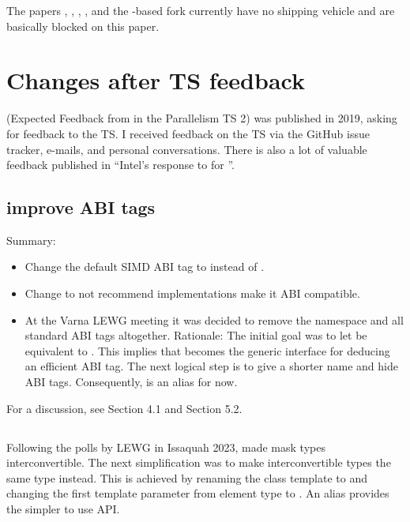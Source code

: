 The papers , , , , and
the -based  fork currently have no shipping vehicle
and are basically blocked on this paper.

\section{Changes after TS feedback}\label{sec:changes}
\cite{P1915R0} (Expected Feedback from  in the Parallelism TS 2) was published in 2019, asking for feedback to the TS.
I received feedback on the TS via the GitHub issue tracker, e-mails, and personal conversations.
There is also a lot of valuable feedback published in  ``Intel’s response to  for \std{}''.

\subsection{improve ABI tags}
Summary:
\begin{itemize}
  \item Change the default SIMD ABI tag to \simdabi{} instead of \simdabi{}.
  \item Change \simdabi{} to not recommend implementations make it ABI compatible.
  \item At the Varna LEWG meeting it was decided to remove the 
    namespace and all standard ABI tags altogether.
    Rationale: The initial goal was to let  be equivalent to
    \stdx\simdabi{}.
    This implies that \stdx{} becomes the generic
    interface for deducing an efficient ABI tag.
    The next logical step is to give  a shorter name and
    hide ABI tags.
    Consequently, \std{} is an alias for
    \std{} now.
\end{itemize}

For a discussion, see  Section 4.1 and  Section 5.2.

\subsection{}\label{sec:basicsimdmask}
Following the polls by LEWG in Issaquah 2023,  made mask types
interconvertible.
The next simplification was to make interconvertible types the same type
instead.
This is achieved by renaming the \stdx{} class template to
\std\mask and changing the first template parameter from element type 
to .
An alias  provides the simpler to use API.

